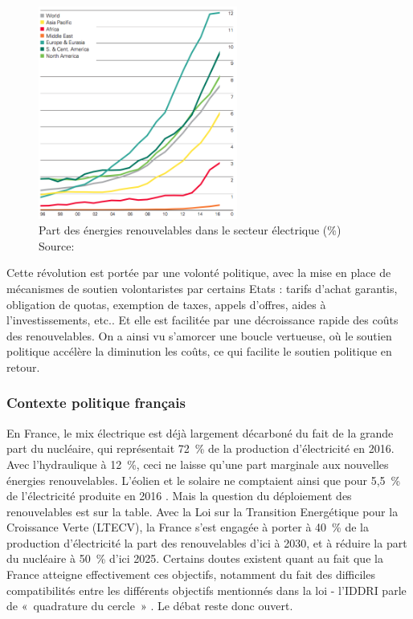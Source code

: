 \begin{figure}[!ht]
	\centering
	\includegraphics[height=7cm]{figures/BP_ENR_Expansion.png}
	\caption[Part des énergies renouvelables dans le secteur électrique (\%)]{Part des énergies renouvelables dans le secteur électrique (\%)\\Source: \citet[p. 43]{BP2017}}
\end{figure}

Cette révolution est portée par une volonté politique, avec la mise en place de mécanismes de soutien volontaristes par certains Etats : tarifs d’achat garantis, obligation de quotas, exemption de taxes, appels d’offres, aides à l’investissements, etc.\citep{EuropeanCommission2013}. Et elle est facilitée par une décroissance rapide des coûts des renouvelables. On a ainsi vu s’amorcer une boucle vertueuse, où le soutien politique accélère la diminution les coûts, ce qui facilite le soutien politique en retour.

\subsubsection{Contexte politique français}
En France, le mix électrique est déjà largement décarboné du fait de la grande part du nucléaire, qui représentait 72~\% de la production d’électricité en 2016. Avec l’hydraulique à 12~\%, ceci ne laisse qu’une part marginale aux nouvelles énergies renouvelables. L’éolien et le solaire ne comptaient ainsi que pour 5,5~\% de l'électricité produite en 2016 \citep{RTE2016}. 
Mais la question du déploiement des renouvelables est sur la table. Avec la Loi sur la Transition Energétique pour la Croissance Verte (LTECV), la France s’est engagée à porter à 40~\% de la production d’électricité la part des renouvelables d’ici à 2030, et à réduire la part du nucléaire à 50~\% d’ici 2025. Certains doutes existent quant au fait que la France atteigne effectivement ces objectifs, notamment du fait des difficiles compatibilités entre les différents objectifs mentionnés dans la loi - l’IDDRI parle de «~quadrature du cercle~» \citep{Rudinger2017}. Le débat reste donc ouvert.

